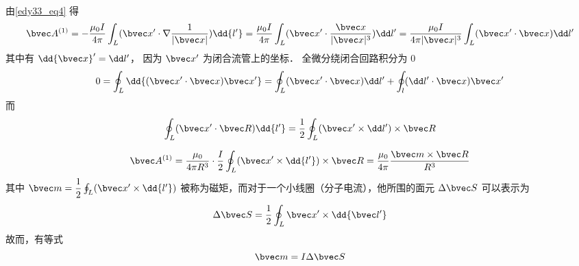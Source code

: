 由\autoref{edy33_eq4} 得
\begin{equation}
\bvec A^{(1)}=-\dfrac{\mu_0 I }{4\pi}\int_L (\bvec x^{\prime}\cdot\nabla\dfrac{1}{|\bvec x|}) \dd{l'}=\dfrac{\mu_0 I }{4\pi}\int_L (\bvec x^{\prime}\cdot\dfrac{\bvec x}{|\bvec x|^3})\dd l^{\prime}
=\dfrac{\mu_0 I }{4\pi|\bvec x|^3}\int_L (\bvec x^{\prime}\cdot \bvec x)\dd l^{\prime}
\label{edy33_eq7}
\end{equation}
其中有 $\dd{\bvec x}^{\prime}=\dd l^{\prime}$， 因为 $ \bvec x^{\prime}$ 为闭合流管上的坐标．
全微分绕闭合回路积分为 $0$
\begin{equation}
0=\oint_L \dd{(\bvec x^{\prime}\cdot \bvec x)\bvec x^{\prime}}=\oint_L (\bvec x^{\prime}\cdot\bvec x)\dd l^{\prime}+\oint_l (\dd l^{\prime}\cdot \bvec x)\bvec x^{\prime}\label{edy33_eq8}
\end{equation}
而
\begin{equation}
\oint_L (\bvec x^{\prime}\cdot \bvec R)\dd{l^{\prime}}=\dfrac1 2\oint_L (\bvec x^{\prime}\times \dd l^{\prime})\times \bvec R \label{edy33_eq9}
\end{equation}

\begin{equation}
\bvec A^{(1)}=\dfrac{\mu_0}{4\pi R^3}\cdot\dfrac{I}{2}\oint_L (\bvec x^{\prime}\times \dd{l^{\prime}})\times \bvec R=\dfrac{\mu_0}{4\pi}\dfrac{\bvec m \times \bvec R}{R^3}\label{edy33_eq10}
\end{equation}
其中 $\bvec m =\dfrac{1}{2}\oint_L (\bvec x^{\prime}\times \dd{l^{\prime}})$ 被称为磁矩，而对于一个小线圈（分子电流），他所围的面元 $\Delta\bvec S$ 可以表示为
\begin{equation}
\Delta\bvec S=\dfrac 1 2\oint_L \bvec x^{\prime}\times \dd{\bvec l^{\prime}}
\end{equation}
故而，有等式
\begin{equation}
\bvec m=I\Delta \bvec S
\end{equation}
